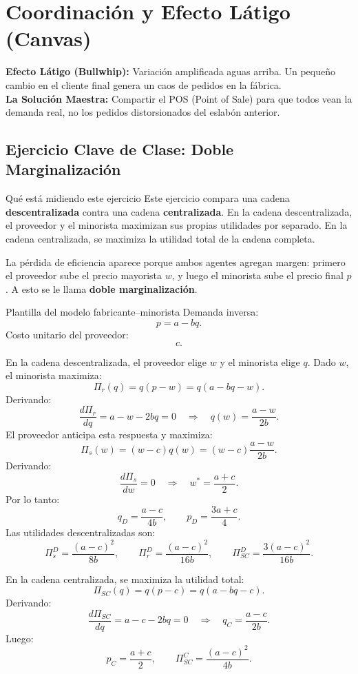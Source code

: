 \section{Coordinación y Efecto Látigo (Canvas)}

\begin{tcolorbox}[colback=cyan!5!white,colframe=cyan!75!black,title=Mapa Mental Rápido (Cópialo)]
\textbf{Efecto Látigo (Bullwhip):} Variación amplificada aguas arriba. Un pequeño cambio en el cliente final genera un caos de pedidos en la fábrica.\\
\textbf{La Solución Maestra:} Compartir el POS (Point of Sale) para que todos vean la demanda real, no los pedidos distorsionados del eslabón anterior.
\end{tcolorbox}

\subsection{Ejercicio Clave de Clase: Doble Marginalización}

\begin{definicion}{Qué está midiendo este ejercicio}
Este ejercicio compara una cadena \textbf{descentralizada} contra una cadena \textbf{centralizada}. En la cadena descentralizada, el proveedor y el minorista maximizan sus propias utilidades por separado. En la cadena centralizada, se maximiza la utilidad total de la cadena completa.

La pérdida de eficiencia aparece porque ambos agentes agregan margen: primero el proveedor sube el precio mayorista \(w\), y luego el minorista sube el precio final \(p\). A esto se le llama \textbf{doble marginalización}.
\end{definicion}

\begin{formulas}{Plantilla del modelo fabricante--minorista}
Demanda inversa:
\[
p=a-bq.
\]
Costo unitario del proveedor:
\[
c.
\]

En la cadena descentralizada, el proveedor elige \(w\) y el minorista elige \(q\). Dado \(w\), el minorista maximiza:
\[
\Pi_r(q)=q(p-w)=q(a-bq-w).
\]
Derivando:
\[
\frac{d\Pi_r}{dq}=a-w-2bq=0
\quad\Rightarrow\quad
q(w)=\frac{a-w}{2b}.
\]
El proveedor anticipa esta respuesta y maximiza:
\[
\Pi_s(w)=(w-c)q(w)
=(w-c)\frac{a-w}{2b}.
\]
Derivando:
\[
\frac{d\Pi_s}{dw}=0
\quad\Rightarrow\quad
w^*=\frac{a+c}{2}.
\]
Por lo tanto:
\[
q_D=\frac{a-c}{4b},
\qquad
p_D=\frac{3a+c}{4}.
\]
Las utilidades descentralizadas son:
\[
\Pi_s^D=\frac{(a-c)^2}{8b},
\qquad
\Pi_r^D=\frac{(a-c)^2}{16b},
\qquad
\Pi_{SC}^D=\frac{3(a-c)^2}{16b}.
\]

En la cadena centralizada, se maximiza la utilidad total:
\[
\Pi_{SC}(q)=q(p-c)=q(a-bq-c).
\]
Derivando:
\[
\frac{d\Pi_{SC}}{dq}=a-c-2bq=0
\quad\Rightarrow\quad
q_C=\frac{a-c}{2b}.
\]
Luego:
\[
p_C=\frac{a+c}{2},
\qquad
\Pi_{SC}^C=\frac{(a-c)^2}{4b}.
\]
\end{formulas}

